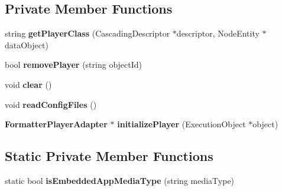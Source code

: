 \subsection*{Private Member Functions}
\begin{CompactItemize}
\item 
string \textbf{getPlayerClass} (CascadingDescriptor $\ast$descriptor, NodeEntity $\ast$dataObject)\label{classbr_1_1pucrio_1_1telemidia_1_1ginga_1_1ncl_1_1adapters_1_1PlayerAdapterManager_1ff60292da9bb1016fd007d31917bf65}

\item 
bool \textbf{removePlayer} (string objectId)\label{classbr_1_1pucrio_1_1telemidia_1_1ginga_1_1ncl_1_1adapters_1_1PlayerAdapterManager_ea934d8e427c85000a418751ffd7110c}

\item 
void \textbf{clear} ()\label{classbr_1_1pucrio_1_1telemidia_1_1ginga_1_1ncl_1_1adapters_1_1PlayerAdapterManager_c8bb3912a3ce86b15842e79d0b421204}

\item 
void \textbf{readConfigFiles} ()\label{classbr_1_1pucrio_1_1telemidia_1_1ginga_1_1ncl_1_1adapters_1_1PlayerAdapterManager_371c1ff8d2b5c14ef46dddc9570cb508}

\item 
{\bf FormatterPlayerAdapter} $\ast$ \textbf{initializePlayer} (ExecutionObject $\ast$object)\label{classbr_1_1pucrio_1_1telemidia_1_1ginga_1_1ncl_1_1adapters_1_1PlayerAdapterManager_42e9a278f5b1ba8bfbd22e2057244709}

\end{CompactItemize}
\subsection*{Static Private Member Functions}
\begin{CompactItemize}
\item 
static bool \textbf{isEmbeddedAppMediaType} (string mediaType)\label{classbr_1_1pucrio_1_1telemidia_1_1ginga_1_1ncl_1_1adapters_1_1PlayerAdapterManager_64536fa08de4f84e08431f08ba89425d}

\end{CompactItemize}
